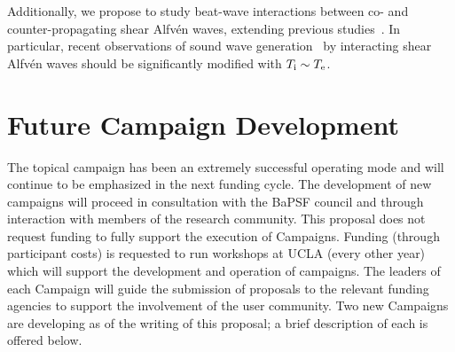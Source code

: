 \documentclass[11pt]{article}
\renewcommand{\cite}{\citep}
\begin{document}
Additionally, we propose to study beat-wave interactions between co-
and counter-propagating shear Alfv\'{e}n waves, extending previous
studies~\cite{carter:2006,auerbach:2010,auerbach:2011,dorfman:2013,dorfman:2015}.
In particular, recent observations of sound wave generation~\cite{dorfman:2013,dorfman:2015} by
interacting shear Alfv\'{e}n waves should be significantly modified
with $T_{\rm i} \sim T_{\rm e}$.

\section{Future Campaign Development}

The topical campaign has been an extremely successful operating mode
and will continue to be emphasized in the next funding cycle. The
development of new campaigns will proceed in consultation with the
BaPSF council and through interaction with members of the research
community.  This proposal does not request funding to fully support
the execution of Campaigns.  Funding (through participant costs) is
requested to run workshops at UCLA (every other year) which will support the
development and operation of campaigns.  The leaders of
each Campaign will guide the submission of proposals to the relevant funding agencies to
support the involvement of the user community.  Two new Campaigns are
developing as of the writing of this proposal; a brief description of
each is offered below.  
\end{document}
